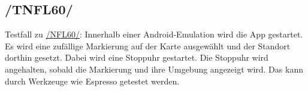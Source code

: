 \subsection*{/TNFL60/}

\label{/TNFL60/} Testfall zu \hyperref[/NFL60/]{/NFL60/}: Innerhalb einer \Gls{Android}-\Gls{Emulation} wird die App gestartet.
Es wird eine zufällige Markierung auf der Karte ausgewählt und der Standort dorthin gesetzt. 
Dabei wird eine Stoppuhr gestartet.
Die Stoppuhr wird angehalten, sobald die Markierung und ihre Umgebung angezeigt wird.
Das kann durch Werkzeuge wie \Gls{Espresso} getestet werden.
